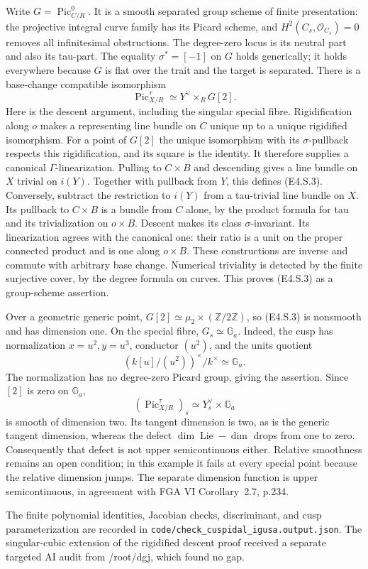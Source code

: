 Write $G=\operatorname{Pic}^0_{C/R}$. It is a smooth separated group
scheme of finite presentation: the projective integral curve family
has its Picard scheme, and $H^2(C_s,\mathcal O_{C_s})=0$ removes
all infinitesimal obstructions. The degree-zero locus is its neutral
part and also its tau-part. The equality $\sigma^*=[-1]$ on $G$
holds generically; it holds everywhere because $G$ is flat over
the trait and the target is separated.
There is a base-change compatible isomorphism
\[
 \operatorname{Pic}^\tau_{X/R}
       \simeq Y^\vee\times_R G[2].                  \tag{E4.S.3}
\]
Here is the descent argument, including the singular special fibre.
Rigidification along $o$ makes a representing line bundle on $C$
unique up to a unique rigidified isomorphism. For a point of $G[2]$
the unique isomorphism with its $\sigma$-pullback respects this
rigidification, and its square is the identity. It therefore supplies
a canonical $\Gamma$-linearization. Pulling to $C\times B$ and
descending gives a line bundle on $X$ trivial on $i(Y)$.
Together with pullback from $Y$, this defines (E4.S.3).
Conversely, subtract the restriction to $i(Y)$ from a tau-trivial
line bundle on $X$. Its pullback to $C\times B$ is a bundle from
$C$ alone, by the product formula for tau and its trivialization on
$o\times B$. Descent makes its class $\sigma$-invariant. Its
linearization agrees with the canonical one: their ratio is a unit
on the proper connected product and is one along $o\times B$.
These constructions are inverse and commute with arbitrary base
change. Numerical triviality is detected by the finite surjective
cover, by the degree formula on curves. This proves (E4.S.3) as a
group-scheme assertion.

Over a geometric generic point,
$G[2]\simeq\mu_2\times(\mathbb Z/2\mathbb Z)$, so (E4.S.3)
is nonsmooth and has dimension one. On the special fibre,
$G_s\simeq\mathbb G_a$. Indeed, the cusp has normalization
$x=u^2,y=u^3$, conductor $(u^2)$, and the units quotient
\[
 (k[u]/(u^2))^\times/k^\times\simeq\mathbb G_a.
\]
The normalization has no degree-zero Picard group, giving the
assertion. Since $[2]$ is zero on $\mathbb G_a$,
\[
 (\operatorname{Pic}^\tau_{X/R})_s
       \simeq Y_s^\vee\times\mathbb G_a
\]
is smooth of dimension two. Its tangent dimension is two, as is
the generic tangent dimension, whereas the defect
$\dim\operatorname{Lie}-\dim$ drops from one to zero.
Consequently that defect is not upper semicontinuous either.
Relative smoothness remains an open condition; in this example it
fails at every special point because the relative dimension jumps.
The separate dimension function is upper semicontinuous, in agreement
with FGA VI Corollary~2.7, p.234.

The finite polynomial identities, Jacobian checks, discriminant,
and cusp parameterization are recorded in
\texttt{code/check\_cuspidal\_igusa.output.json}.
The singular-cubic extension of the rigidified descent proof received
a separate targeted AI audit from /root/dgj, which found no gap.
